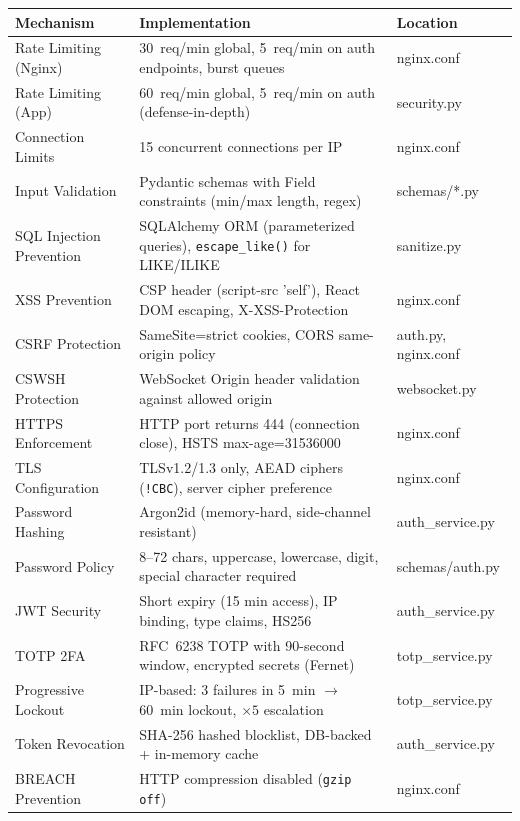 \documentclass[12pt,a4paper]{article}
\begin{document}
\begin{center}
\small
\begin{tabularx}{\textwidth}{lXl}
\toprule
\textbf{Mechanism} & \textbf{Implementation} & \textbf{Location} \\
\midrule
Rate Limiting (Nginx) & 30~req/min global, 5~req/min on auth endpoints, burst queues & nginx.conf \\
Rate Limiting (App) & 60~req/min global, 5~req/min on auth (defense-in-depth) & security.py \\
Connection Limits & 15 concurrent connections per IP & nginx.conf \\
Input Validation & Pydantic schemas with Field constraints (min/max length, regex) & schemas/*.py \\
SQL Injection Prevention & SQLAlchemy ORM (parameterized queries), \texttt{escape\_like()} for LIKE/ILIKE & sanitize.py \\
XSS Prevention & CSP header (script-src 'self'), React DOM escaping, X-XSS-Protection & nginx.conf \\
CSRF Protection & SameSite=strict cookies, CORS same-origin policy & auth.py, nginx.conf \\
CSWSH Protection & WebSocket Origin header validation against allowed origin & websocket.py \\
HTTPS Enforcement & HTTP port returns 444 (connection close), HSTS max-age=31536000 & nginx.conf \\
TLS Configuration & TLSv1.2/1.3 only, AEAD ciphers (\verb|!CBC|), server cipher preference & nginx.conf \\
Password Hashing & Argon2id (memory-hard, side-channel resistant) & auth\_service.py \\
Password Policy & 8--72 chars, uppercase, lowercase, digit, special character required & schemas/auth.py \\
JWT Security & Short expiry (15 min access), IP binding, type claims, HS256 & auth\_service.py \\
TOTP 2FA & RFC~6238 TOTP with 90-second window, encrypted secrets (Fernet) & totp\_service.py \\
Progressive Lockout & IP-based: 3 failures in 5~min $\rightarrow$ 60~min lockout, $\times 5$ escalation & totp\_service.py \\
Token Revocation & SHA-256 hashed blocklist, DB-backed + in-memory cache & auth\_service.py \\
BREACH Prevention & HTTP compression disabled (\texttt{gzip off}) & nginx.conf \\

\end{tabularx}
\end{center}
\end{document}

